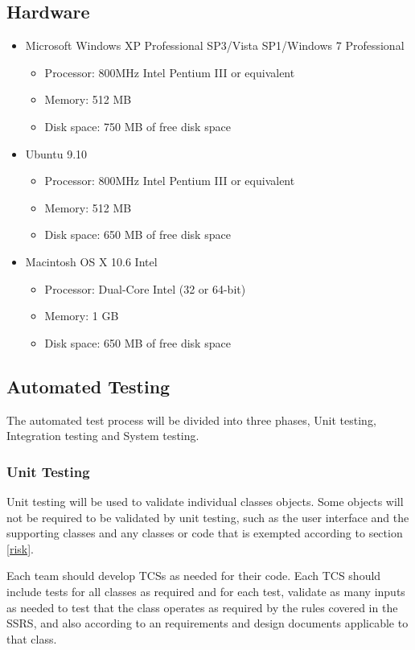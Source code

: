 \documentclass[report]{article}
\begin{document}
\subsection{Hardware}
\begin{itemize}
\item Microsoft Windows XP Professional SP3/Vista SP1/Windows 7 Professional
\begin{itemize}
	\item Processor: 800MHz Intel Pentium III or equivalent
	\item Memory: 512 MB
	\item Disk space: 750 MB of free disk space
\end{itemize}
\item Ubuntu 9.10
\begin{itemize}
	\item Processor: 800MHz Intel Pentium III or equivalent
	\item Memory: 512 MB
	\item Disk space: 650 MB of free disk space
\end{itemize}
\item Macintosh OS X 10.6 Intel
\begin{itemize}
	\item Processor: Dual-Core Intel (32 or 64-bit)
	\item Memory: 1 GB
	\item Disk space: 650 MB of free disk space
\end{itemize}
\end{itemize}

\subsection{Automated Testing}
The automated test process will be divided into three phases, Unit testing, Integration testing and System testing.

\subsubsection{Unit Testing}
Unit testing will be used to validate individual classes objects. Some objects will not be required to be validated by unit testing, such as the user interface and the supporting classes and any classes or code that is exempted according to section \ref{risk}.

Each team should develop TCSs as needed for their code. Each TCS should include tests for all classes as required and for each test, validate as many inputs as needed to test that the class operates as required by the rules covered in the SSRS, and also according to an requirements and design documents applicable to that class.
\end{document}
